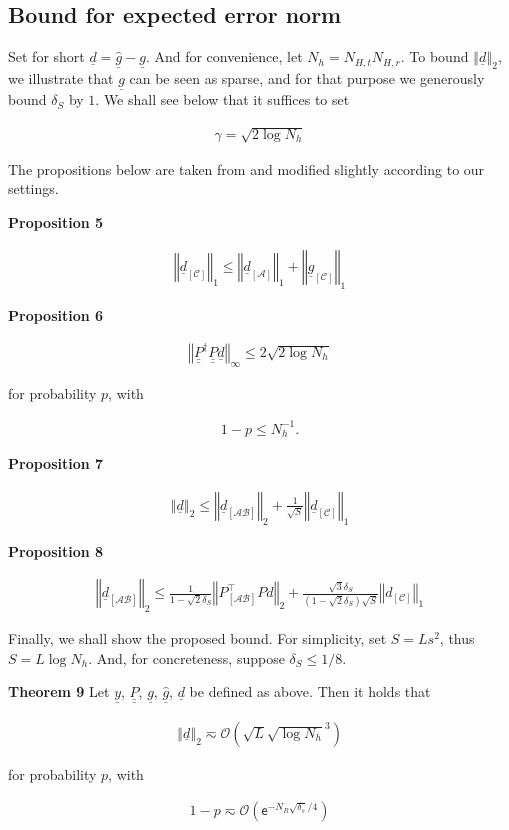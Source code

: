 \documentclass[journal]{IEEEtran}
\newcommand {\g} {\gamma}
\renewcommand {\d} {\delta}
\newcommand {\m} [1] {\( #1 \)}
\newcommand {\V} [1] {\underline {#1}}
\newcommand {\M} [1] {\underline {\underline {#1}}}
\newcommand {\RB} [1] {\left( #1 \right)}
\newcommand {\SB} [1] {\left[ #1 \right]}
\newcommand {\VNm} [1] {\left \Vert #1 \right \Vert}
\newcommand {\R} [1] {\sqrt {#1}}
\newcommand {\Disp} [1] {
   \begin {align*}
      #1
   \end {align*}
}
\begin{document}

\subsection {Bound for expected error norm}

Set for short \m {\V {d} = \hat {\V {g}} - \V {g}}.
And for convenience, let \m {N_h = N_{H,t} N_{H,r}}.
%
To bound \m {\VNm {\V {d}} _2}, we illustrate that \m {\V {g}} can be seen as sparse, and for that purpose we generously bound \m {\d_{S}} by \m {1}.
We shall see below that it suffices to set
\Disp {
\g
= \R {2 \log N_h} 
}

The propositions below are taken from \cite {CaT07} and modified slightly according to our settings.

\textbf {Proposition 5}
\Disp {
\VNm {\V {d} _{\SB{\mathcal {C}}}} _1
\leq \VNm {\V {d} _{\SB{\mathcal {A}}}} _1
+\VNm {\V {g} _{\SB{\mathcal {C}}}} _1 
}

\textbf {Proposition 6}
\Disp {
\VNm {\M {P}^\dagger \M {P} \V {d}} _\infty
\leq 2 \R {2 \log N_h} 
}
for probability \m {p}, with
\Disp {
1 -p
\leq N_h^{-1}.
}

\textbf {Proposition 7}
\Disp {
\VNm {\V {d}} _2
\leq \VNm {\V {d} _{\SB {\mathcal {AB}}}} _2 + \frac {1} {\R {S}} \VNm {\V {d} _{\SB{\mathcal {C}}}} _1 
}

\textbf {Proposition 8}
\Disp {
\VNm {\V {d} _{\SB{\mathcal {AB}}}} _2
\leq \frac {1} {1- \R{2} \d_{S}} \VNm {P _{\SB {\mathcal {AB}}}^\intercal P d} _2
+ \frac {\R{3} \d_{S}} {\RB {1- \R{2} \d_{S}} \R {S}} \VNm {d_{\SB{\mathcal {C}}}} _1 
}

Finally, we shall show the proposed bound.
For simplicity, set \m {S = Ls^2}, thus \m {S =L \log N_h}.
And, for concreteness, suppose \m {\d_S \leq 1/8}.

\textbf {Theorem 9}
Let \m {\V {y}}, \m {\M {P}}, \m {\V {g}}, \m {\hat {\V {g}}}, \m {\V {d}} be defined as above.
Then it holds that
\Disp {
\VNm {\V {d}} _2
\eqsim \mathcal {O} \RB {\R {L} \R {\log N_h}^3} 
}
for probability \m {p}, with
\Disp {
1 -p
\eqsim \mathcal {O} \RB {\mathsf {e} ^{-N_R \R {\d_s} /4}} 
}
\end{document}
